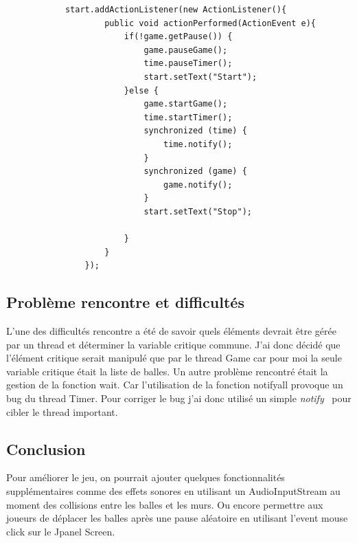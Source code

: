 \documentclass{article}
\begin{document}
\begin{verbatim}
		    start.addActionListener(new ActionListener(){
			        public void actionPerformed(ActionEvent e){
			        	if(!game.getPause()) {
			        		game.pauseGame();
			        		time.pauseTimer();
			        		start.setText("Start");
			        	}else {
			        		game.startGame();
			        		time.startTimer();
			        		synchronized (time) {
			        			time.notify();
							}
			        		synchronized (game) {
								game.notify();
							}
			        		start.setText("Stop");

			        	}
			        }
		        });
\end{verbatim}

\subsection{Problème rencontre et difficultés}
L’une des difficultés rencontre a été de savoir quels éléments devrait être gérée par un thread et déterminer la variable critique commune. J’ai donc décidé que l'élément critique serait manipulé que par le thread Game car pour moi la seule variable critique était la liste de balles. Un autre problème rencontré était la gestion de la fonction wait. Car l’utilisation de la fonction notifyall provoque un bug du thread Timer. Pour corriger le bug j’ai donc utilisé un simple \textit{notify}~\cite{notifyDoc} pour cibler le thread important. 

\subsection{Conclusion}
Pour améliorer le jeu, on pourrait ajouter quelques fonctionnalités supplémentaires comme des effets sonores en utilisant  un AudioInputStream au moment des collisions entre les balles et les murs. Ou encore permettre aux joueurs de déplacer les balles après une pause aléatoire en utilisant l’event mouse click sur le Jpanel Screen. 


\end{document}
